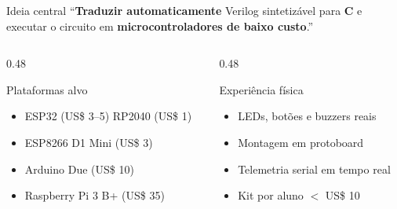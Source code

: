 \documentclass[10pt, aspectratio=169]{beamer}
\begin{document}
\begin{frame}{Ideia central}
  \centering
  \large
  ``\textbf{Traduzir automaticamente} Verilog sintetizável para \textbf{C} e
  executar o circuito em \textbf{microcontroladores de baixo custo}.''
  \vspace{0.5em}

  \begin{columns}[t]
    \begin{column}{0.48\textwidth}
      \begin{exampleblock}{Plataformas alvo}
        \small
        \begin{itemize}
          \item ESP32 (US\$ 3--5) \qquad RP2040 (US\$ 1)
          \item ESP8266 D1 Mini (US\$ 3)
          \item Arduino Due (US\$ 10)
          \item Raspberry Pi 3 B+ (US\$ 35)
        \end{itemize}
      \end{exampleblock}
    \end{column}
    \begin{column}{0.48\textwidth}
      \begin{exampleblock}{Experiência física}
        \small
        \begin{itemize}
          \item LEDs, botões e buzzers reais
          \item Montagem em protoboard
          \item Telemetria serial em tempo real
          \item Kit por aluno \alert{$<$ US\$ 10}
        \end{itemize}
      \end{exampleblock}
    \end{column}
  \end{columns}
\end{frame}
\end{document}
